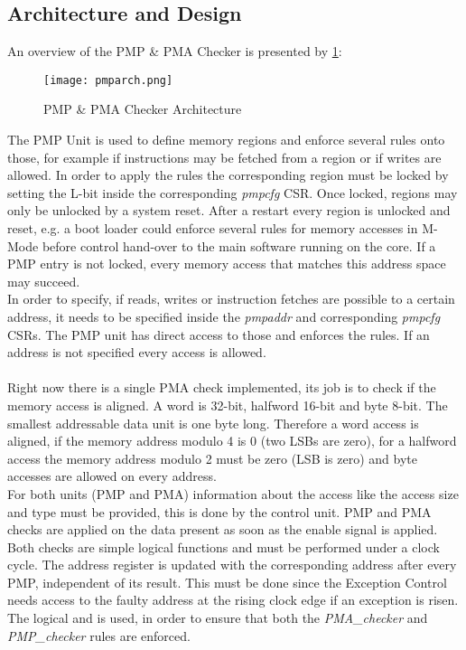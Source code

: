 \subsection{Architecture and Design}
An overview of the PMP \& PMA Checker is presented by \ref{fig:pmparch}:
\begin{figure}[H]
	\centering
	\texttt{[image: pmparch.png]}
	\caption{PMP \& PMA Checker Architecture}
	\label{fig:pmparch}
\end{figure}
The PMP Unit is used to define memory regions and enforce several rules onto
those, for example if instructions may be fetched from a region or if writes are
allowed. In order to apply the rules the corresponding region must be locked by
setting the L-bit inside the corresponding \textit{pmpcfg} CSR. Once locked, regions may only be unlocked by a system reset. After a restart every region is unlocked and
reset, e.g. a boot loader could enforce several rules for memory accesses in M-Mode before control hand-over to the main software running on the core. If a PMP entry is not locked, every memory access that matches this address space may succeed.
\\
In order to specify, if reads, writes or instruction fetches are possible to a certain address, it needs to be specified inside the \textit{pmpaddr} and corresponding \textit{pmpcfg} CSRs. The PMP unit has direct access to those and enforces the rules. If an address is not specified every access is allowed.\\
\\
Right now there is a single PMA check implemented, its job is to check if the memory
access is aligned. A word is 32-bit, halfword 16-bit and byte 8-bit. The smallest
addressable data unit is one byte long. Therefore a word access is aligned, if the
memory address modulo 4 is 0 (two LSBs are zero), for a halfword access the
memory address modulo 2 must be zero (LSB is zero) and byte accesses are allowed
on every address.
\\
For both units (PMP and PMA) information about the access like the access size
and type must be provided, this is done by the control unit. PMP and PMA checks
are applied on the data present as soon as the enable signal is applied. Both checks
are simple logical functions and must be performed under a clock cycle. The address
register is updated with the corresponding address after every PMP, independent of
its result. This must be done since the Exception Control needs access to the faulty
address at the rising clock edge if an exception is risen.
\\
The logical and is used, in order to ensure that both the \textit{PMA\_checker} and
\textit{PMP\_checker} rules are enforced.
